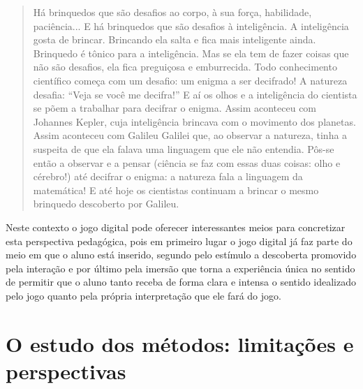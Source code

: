 \documentclass[article,11pt, a4paper,sumario=tradicional]{abntex2}
\begin{document}
    \begin{quote}
        Há brinquedos que são desafios ao corpo, à sua força, habilidade, paciência... E há brinquedos que são desafios à inteligência. A inteligência gosta de brincar. Brincando ela salta e fica mais inteligente ainda. Brinquedo é tônico para a inteligência. Mas se ela tem de fazer coisas que não são desafios, ela fica preguiçosa e emburrecida. Todo conhecimento científico começa com um desafio: um enigma a ser decifrado! A natureza desafia: “Veja se você me decifra!” E aí os olhos e a inteligência do cientista se põem a trabalhar para decifrar o enigma. Assim aconteceu com Johannes Kepler, cuja inteligência brincava com o movimento dos planetas. Assim aconteceu com Galileu Galilei que, ao observar a natureza, tinha a suspeita de que ela falava uma linguagem que ele não entendia. Pôs-se então a observar e a pensar (ciência se faz com essas duas coisas: olho e cérebro!) até decifrar o enigma: a natureza fala a linguagem da matemática! E até hoje os cientistas continuam a brincar o mesmo brinquedo descoberto por Galileu.
    \end{quote}


    Neste contexto o jogo digital pode oferecer interessantes meios para concretizar esta perspectiva pedagógica, pois em primeiro lugar o jogo digital já faz parte do meio em que o aluno está inserido, segundo pelo estímulo a descoberta promovido pela interação e por último pela imersão que torna a experiência única no sentido de permitir que o aluno tanto receba de forma clara e intensa o sentido idealizado pelo jogo quanto pela própria interpretação que ele fará do jogo.


\section{O estudo dos métodos: limitações e perspectivas}
\end{document}
